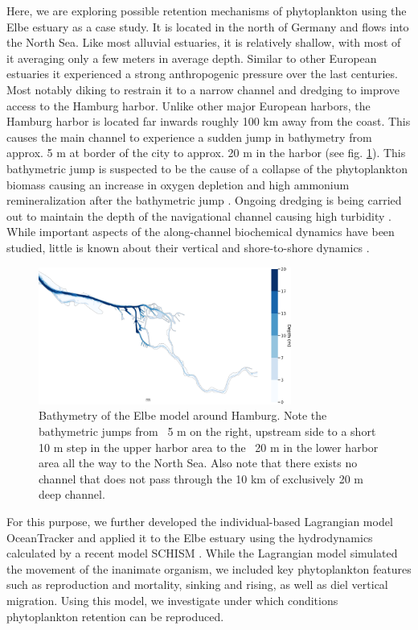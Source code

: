 \documentclass[npg, manuscript]{copernicus}
\begin{document}
Here, we are exploring possible retention mechanisms of phytoplankton using the Elbe estuary as a case study.
It is located in the north of Germany and flows into the North Sea.
Like most alluvial estuaries, it is relatively shallow, with most of it averaging only a few meters in average depth.
Similar to other European estuaries it experienced a strong anthropogenic pressure over the last centuries.
Most notably diking to restrain it to a narrow channel and dredging to improve access to the Hamburg harbor.
Unlike other major European harbors, the Hamburg harbor is located far inwards roughly 100 \unit{km} away from the coast.
This causes the main channel to experience a sudden jump in bathymetry from approx. 5 \unit{m} at border of the city to approx. 20 \unit{m} in the harbor (see fig. \ref{fig:bathymetry}). 
This bathymetric jump is suspected to be the cause of a collapse of the phytoplankton biomass causing an increase in oxygen depletion and high ammonium remineralization after the bathymetric jump \citep{Schroeder1997,Holzwarth2018,Sanders2018}.
Ongoing dredging is being carried out to maintain the depth of the navigational channel causing high turbidity \citep{Kappenberg2001}.
While important aspects of the along-channel biochemical dynamics have been studied, little is known about their vertical and shore-to-shore dynamics \citep{Goosen1999, Dahnke2008, Sanders2018}.

\begin{figure}
    \includegraphics[width=8.3cm]{figures/harbor.png}
    \caption{Bathymetry of the Elbe model around Hamburg. Note the bathymetric jumps from ~5 \unit{m} on the right, upstream side to a short 10 \unit{m} step in the upper harbor area to the ~20 \unit{m} in the lower harbor area all the way to the North Sea. Also note that there exists no channel that does not pass through the 10 \unit{km} of exclusively 20 \unit{m} deep channel.}
    \label{fig:bathymetry}
\end{figure}

For this purpose, we further developed the individual-based Lagrangian model OceanTracker \citep{Vennell2021} and applied it to the Elbe estuary using the hydrodynamics calculated by a recent model SCHISM \citep{Pein2021}.
While the Lagrangian model simulated the movement of the inanimate organism, we included key phytoplankton features such as reproduction and mortality, sinking and rising, as well as diel vertical migration. %
Using this model, we investigate under which conditions phytoplankton retention can be reproduced.
\end{document}
